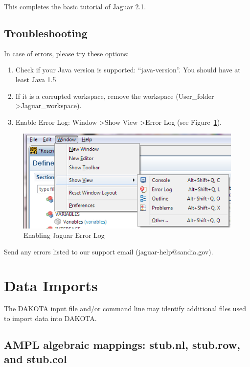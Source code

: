 This completes the basic tutorial of Jaguar 2.1.

\subsection{Troubleshooting}

In case of errors, please try these options:
\begin{enumerate}
\item  Check if your Java version is supported: ``java-version''. You should have at least Java 1.5
\item  If it is a corrupted workspace, remove the workspace (User\_folder \textgreater Jaguar\_workspace).
\item  Enable Error Log: Window \textgreater Show View \textgreater Error Log (see Figure~\ref{fig:input:11ShowView}).
\end{enumerate}

\begin{figure}[htbp]
  \centering
  \includegraphics[scale=0.6]{images/11ShowView}
  \caption{Enabling Jaguar Error Log}
  \label{fig:input:11ShowView}
\end{figure}


Send any errors listed to our support email (jaguar-help@sandia.gov).

\newpage
\section{Data Imports}\label{input:import}

The DAKOTA input file and/or command line may identify additional
files used to import data into DAKOTA.

\subsection{AMPL algebraic mappings: stub.nl, stub.row, and stub.col}

